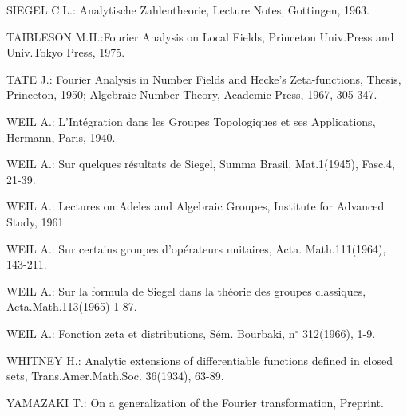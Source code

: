 \begin{thebibliography}{99}
 SIEGEL C.L.: Analytische Zahlentheorie, Lecture Notes,
  Gottingen, 1963. 

 TAIBLESON M.H.:\pageoriginale Fourier Analysis on Local
  Fields, Princeton Univ.\@ Press and Univ.\@ Tokyo Press, 1975.

 TATE J.: Fourier Analysis in Number Fields and Hecke's
  Zeta-functions, Thesis, Princeton, 1950; Algebraic Number Theory,
  Academic Press, 1967, 305-347.

 WEIL A.: L'Int\'egration dans les Groupes Topologiques
  et ses Applications, Hermann, Paris, 1940.

 WEIL A.: Sur quelques r\'esultats de Siegel, Summa
  Brasil, Mat.\@ 1(1945), Fasc.\@ 4, 21-39.

 WEIL A.: Lectures on Adeles and Algebraic Groupes,
  Institute for Advanced Study, 1961.

 WEIL A.: Sur certains groupes d'op\'erateurs
  unitaires, Acta. Math.\@ 111(1964), 143-211.

 WEIL A.: Sur la formula de Siegel dans la th\'eorie
  des groupes classiques, Acta.\@ Math.\@ 113(1965) 1-87.

 WEIL A.: Fonction zeta et distributions, S\'em.\@
  Bourbaki, n$^{\circ}$ 312(1966), 1-9.

 WHITNEY H.: Analytic extensions of differentiable
  functions defined in closed sets, Trans.\@ Amer.\@ Math.\@ Soc.\@
  36(1934), 63-89.

 YAMAZAKI T.: On a generalization of the Fourier
  transformation, Preprint.
\end{thebibliography}
